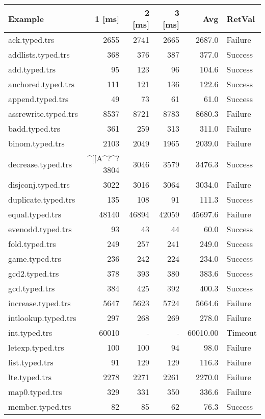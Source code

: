 \documentclass[11pt]{article}
\begin{document}
\begin{center}
\begin{tabular}{lrrrrl}
Example & 1 [ms] & 2 [ms] & 3 [ms] & Avg & RetVal\\
\hline
ack.typed.trs & 2655 & 2741 & 2665 & 2687.0 & Failure\\
addlists.typed.trs & 368 & 376 & 387 & 377.0 & Success\\
add.typed.trs & 95 & 123 & 96 & 104.6 & Success\\
anchored.typed.trs & 111 & 121 & 136 & 122.6 & Success\\
append.typed.trs & 49 & 73 & 61 & 61.0 & Success\\
assrewrite.typed.trs & 8537 & 8721 & 8783 & 8680.3 & Failure\\
badd.typed.trs & 361 & 259 & 313 & 311.0 & Failure\\
binom.typed.trs & 2103 & 2049 & 1965 & 2039.0 & Failure\\
decrease.typed.trs & \^{}[[A\^{}?\^{}?    3804 & 3046 & 3579 & 3476.3 & Success\\
disjconj.typed.trs & 3022 & 3016 & 3064 & 3034.0 & Failure\\
duplicate.typed.trs & 135 & 108 & 91 & 111.3 & Success\\
equal.typed.trs & 48140 & 46894 & 42059 & 45697.6 & Failure\\
evenodd.typed.trs & 93 & 43 & 44 & 60.0 & Success\\
fold.typed.trs & 249 & 257 & 241 & 249.0 & Success\\
game.typed.trs & 236 & 242 & 224 & 234.0 & Success\\
gcd2.typed.trs & 378 & 393 & 380 & 383.6 & Success\\
gcd.typed.trs & 384 & 425 & 392 & 400.3 & Success\\
increase.typed.trs & 5647 & 5623 & 5724 & 5664.6 & Failure\\
intlookup.typed.trs & 297 & 268 & 269 & 278.0 & Failure\\
int.typed.trs & 60010 & - & - & 60010.00 & Timeout\\
letexp.typed.trs & 100 & 100 & 94 & 98.0 & Failure\\
list.typed.trs & 91 & 129 & 129 & 116.3 & Failure\\
lte.typed.trs & 2278 & 2271 & 2261 & 2270.0 & Failure\\
map0.typed.trs & 329 & 331 & 350 & 336.6 & Failure\\
member.typed.trs & 82 & 85 & 62 & 76.3 & Success\\

\end{tabular}
\end{center}
\end{document}

